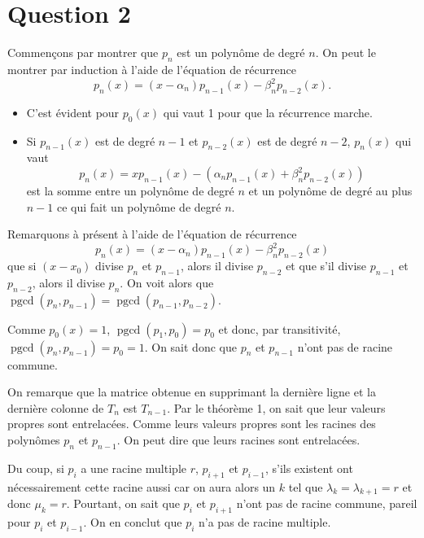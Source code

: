 \documentclass{article}
\DeclareMathOperator{\pgcd}{pgcd} %
\DeclareMathOperator{\newdiff}{d} %
\newcommand{\dif}{\newdiff\!}
\begin{document}
\section*{Question 2}
Commençons par montrer que $p_n$ est un polynôme de degré $n$.
On peut le montrer par induction à l'aide de l'équation de récurrence
\[ p_n(x) = (x - \alpha_n)p_{n-1}(x) - \beta_n^2p_{n-2}(x). \]
\begin{itemize}
  \item C'est évident pour $p_0(x)$ qui vaut 1 pour que la récurrence
    marche.
  \item Si $p_{n-1}(x)$ est de degré $n-1$ et $p_{n-2}(x)$ est de degré
    $n-2$, $p_n(x)$ qui vaut
    \[ p_n(x) = xp_{n-1}(x) - (\alpha_np_{n-1}(x) + \beta_n^2p_{n-2}(x)) \]
    est la somme entre un polynôme de degré $n$ et un polynôme de
    degré au plus $n-1$ ce qui fait un polynôme de degré $n$.
\end{itemize}

Remarquons à présent à l'aide de l'équation de récurrence
\[ p_n(x) = (x - \alpha_n)p_{n-1}(x) - \beta_n^2p_{n-2}(x) \]
que si $(x-x_0)$ divise $p_n$ et $p_{n-1}$, alors il divise
$p_{n-2}$ et que s'il divise $p_{n-1}$ et $p_{n-2}$, alors il divise $p_n$.
On voit alors que $\pgcd(p_n, p_{n-1}) = \pgcd(p_{n-1}, p_{n-2})$.

Comme $p_0(x) = 1$, $\pgcd(p_1,p_0) = p_0$ et donc, par transitivité,
$\pgcd(p_n, p_{n-1}) = p_0 = 1$.
On sait donc que $p_n$ et $p_{n-1}$ n'ont pas de racine commune.

On remarque que la matrice obtenue en supprimant
la dernière ligne et la dernière colonne de $T_n$ est $T_{n-1}$.
Par le théorème 1, on sait que leur valeurs propres sont entrelacées.
Comme leurs valeurs propres sont les racines des polynômes $p_n$ et $p_{n-1}$.
On peut dire que leurs racines sont entrelacées.

Du coup, si $p_i$ a une racine multiple $r$, $p_{i+1}$ et $p_{i-1}$,
s'ils existent ont nécessairement cette racine aussi car on aura alors
un $k$ tel que $\lambda_k = \lambda_{k+1} = r$ et donc $\mu_{k} = r$.
Pourtant, on sait que $p_i$ et $p_{i+1}$ n'ont pas de racine commune,
pareil pour $p_i$ et $p_{i-1}$.
On en conclut que $p_i$ n'a pas de racine multiple.
\end{document}
